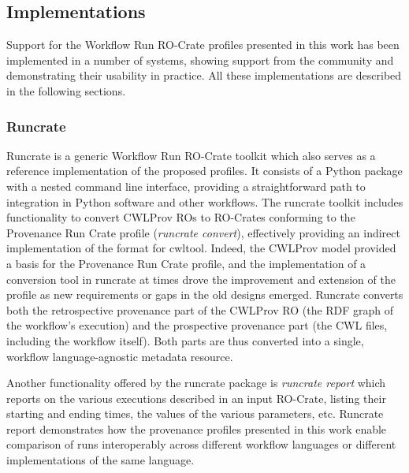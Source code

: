 \subsection{Implementations}\label{ch54:implementations}

Support for the Workflow Run RO-Crate profiles presented in this work has been implemented in a number of systems, showing support from the community and demonstrating their usability in practice.
All these implementations are described in the following sections.


\subsubsection{Runcrate}\label{ch54:runcrate}

Runcrate \cite{runcrate} is a generic Workflow Run RO-Crate toolkit which also serves as a reference implementation of the proposed profiles.
It consists of a Python package with a nested command line interface, providing a straightforward path to integration in Python software and other workflows.
The runcrate toolkit includes functionality to convert CWLProv ROs to RO-Crates conforming to the Provenance Run Crate profile (\emph{runcrate convert}), effectively providing an indirect implementation of the format for cwltool.
Indeed, the CWLProv model provided a basis for the Provenance Run Crate profile, and the implementation of a conversion tool in runcrate at times drove the improvement and extension of the profile as new requirements or gaps in the old designs emerged.
Runcrate converts both the retrospective provenance part of the CWLProv RO (the RDF graph of the workflow's execution) and the prospective provenance part (the CWL files, including the workflow itself).
Both parts are thus converted into a single, workflow language-agnostic metadata resource.

Another functionality offered by the runcrate package is \emph{runcrate report} which reports on the various executions described in an input RO-Crate, listing their starting and ending times, the values of the various parameters, etc.
Runcrate report demonstrates how the provenance profiles presented in this work enable comparison of runs interoperably across different workflow languages or different implementations of the same language.

